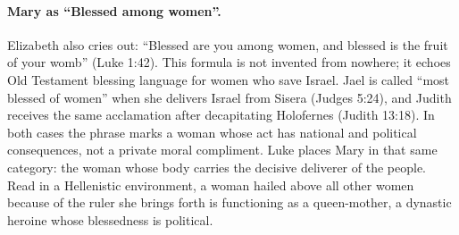\paragraph{Mary as ``Blessed among women''.}
Elizabeth also cries out: ``Blessed are you among women, and blessed is the fruit of your womb'' (Luke 1:42).
This formula is not invented from nowhere; it echoes Old Testament blessing language for women who save Israel.
Jael is called ``most blessed of women'' when she delivers Israel from Sisera (Judges 5:24), and Judith receives the same acclamation after decapitating Holofernes (Judith 13:18).
In both cases the phrase marks a woman whose act has national and political consequences, not a private moral compliment.
Luke places Mary in that same category: the woman whose body carries the decisive deliverer of the people.
Read in a Hellenistic environment, a woman hailed above all other women because of the ruler she brings forth is functioning as a queen-mother, a dynastic heroine whose blessedness is political.

